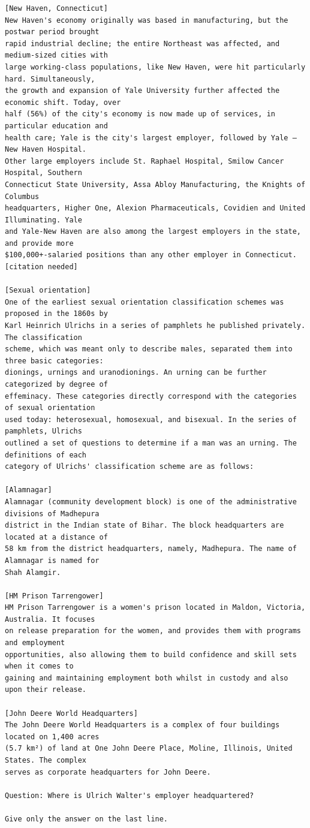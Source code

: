 \documentclass[10pt]{article}
\begin{document}
\begin{verbatim}
[New Haven, Connecticut]
New Haven's economy originally was based in manufacturing, but the postwar period brought
rapid industrial decline; the entire Northeast was affected, and medium-sized cities with
large working-class populations, like New Haven, were hit particularly hard. Simultaneously,
the growth and expansion of Yale University further affected the economic shift. Today, over
half (56%) of the city's economy is now made up of services, in particular education and
health care; Yale is the city's largest employer, followed by Yale – New Haven Hospital.
Other large employers include St. Raphael Hospital, Smilow Cancer Hospital, Southern
Connecticut State University, Assa Abloy Manufacturing, the Knights of Columbus
headquarters, Higher One, Alexion Pharmaceuticals, Covidien and United Illuminating. Yale
and Yale-New Haven are also among the largest employers in the state, and provide more
$100,000+-salaried positions than any other employer in Connecticut.[citation needed]

[Sexual orientation]
One of the earliest sexual orientation classification schemes was proposed in the 1860s by
Karl Heinrich Ulrichs in a series of pamphlets he published privately. The classification
scheme, which was meant only to describe males, separated them into three basic categories:
dionings, urnings and uranodionings. An urning can be further categorized by degree of
effeminacy. These categories directly correspond with the categories of sexual orientation
used today: heterosexual, homosexual, and bisexual. In the series of pamphlets, Ulrichs
outlined a set of questions to determine if a man was an urning. The definitions of each
category of Ulrichs' classification scheme are as follows:

[Alamnagar]
Alamnagar (community development block) is one of the administrative divisions of Madhepura
district in the Indian state of Bihar. The block headquarters are located at a distance of
58 km from the district headquarters, namely, Madhepura. The name of Alamnagar is named for
Shah Alamgir.

[HM Prison Tarrengower]
HM Prison Tarrengower is a women's prison located in Maldon, Victoria, Australia. It focuses
on release preparation for the women, and provides them with programs and employment
opportunities, also allowing them to build confidence and skill sets when it comes to
gaining and maintaining employment both whilst in custody and also upon their release.

[John Deere World Headquarters]
The John Deere World Headquarters is a complex of four buildings located on 1,400 acres
(5.7 km²) of land at One John Deere Place, Moline, Illinois, United States. The complex
serves as corporate headquarters for John Deere.

Question: Where is Ulrich Walter's employer headquartered?

Give only the answer on the last line.
\end{verbatim}
\end{document}

